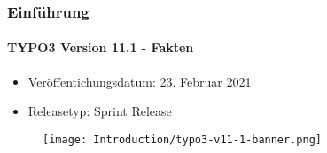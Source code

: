 %

\begin{frame}[fragile]
	\frametitle{Einführung}
	\framesubtitle{TYPO3 Version 11.1 - Fakten}

	\begin{itemize}
		\item Veröffentichungsdatum: 23. Februar 2021
		\item Releasetyp: Sprint Release
	\end{itemize}

	\begin{figure}
		\texttt{[image: Introduction/typo3-v11-1-banner.png]}
	\end{figure}

\end{frame}

